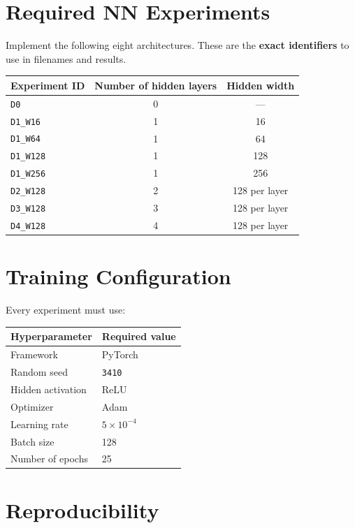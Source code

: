 \documentclass[11pt,a4paper]{article}
\newcommand{\code}[1]{\texttt{#1}}
\begin{document}
\section{Required NN Experiments}

Implement the following eight architectures. These are the \textbf{exact identifiers} to use in filenames and results.

\begin{center}
\begin{tabular}{lcc}
\toprule
\textbf{Experiment ID} & \textbf{Number of hidden layers} & \textbf{Hidden width} \\
\midrule
\code{D0} & 0 & --- \\
\code{D1\_W16} & 1 & 16 \\
\code{D1\_W64} & 1 & 64 \\
\code{D1\_W128} & 1 & 128 \\
\code{D1\_W256} & 1 & 256 \\
\code{D2\_W128} & 2 & 128 per layer \\
\code{D3\_W128} & 3 & 128 per layer \\
\code{D4\_W128} & 4 & 128 per layer \\
\bottomrule
\end{tabular}
\end{center}

\section{Training Configuration}

Every experiment must use:

\begin{center}
\begin{tabular}{ll}
\toprule
\textbf{Hyperparameter} & \textbf{Required value} \\
\midrule
Framework & PyTorch \\
Random seed & \code{3410} \\
Hidden activation & ReLU \\
Optimizer & Adam \\
Learning rate & $5\times10^{-4}$ \\
Batch size & 128 \\
Number of epochs & 25 \\
\bottomrule
\end{tabular}
\end{center}

\section{Reproducibility}
\end{document}
